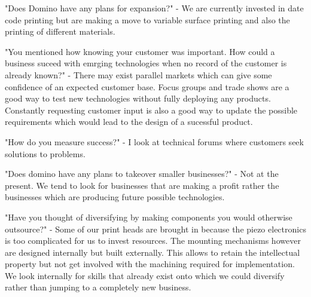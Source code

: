 \documentclass{elec6049Report}     %
\begin{document}
"Does Domino have any plans for expansion?" - 
We are currently invested in date code printing but are making a move to variable surface printing and also the printing of different materials.

"You mentioned how knowing your customer was important. How could a business suceed with emrging technologies when no record of the customer is already known?" -
There may exist parallel markets which can give some confidence of an expected customer base.
Focus groups and trade shows are a good way to test new technologies without fully deploying any products.
Constantly requesting customer input is also a good way to update the possible requirements which would lead to the design of a sucessful product.

"How do you measure success?" -
I look at technical forums where customers seek solutions to problems.

"Does domino have any plans to takeover smaller businesses?" -
Not at the present.
We tend to look for businesses that are making a profit rather the businesses which are producing future possible technologies.

"Have you thought of diversifying by making components you would otherwise outsource?" - 
Some of our print heads are brought in because the piezo electronics is too complicated for us to invest resources.
The mounting mechanisms however are designed internally but built externally. 
This allows to retain the intellectual property but not get involved with the machining required for implementation.
We look internally for skills that already exist onto which we could diversify rather than jumping to a completely new business. 
\end{document}
